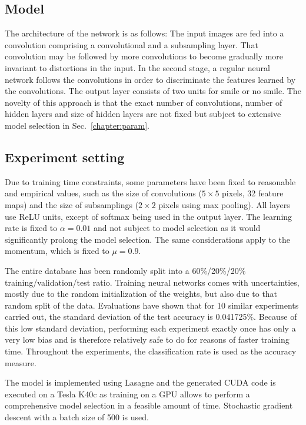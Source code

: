 \documentclass{ws-procs9x6}
\begin{document}
\subsection{Model}
The architecture of the network is as follows:
The input images are fed into a convolution comprising a convolutional and a subsampling layer. That convolution may be followed by more convolutions to become gradually more invariant to distortions in the input. In the second stage, a regular neural network follows the convolutions in order to discriminate the features learned by the convolutions. The output layer consists of two units for smile or no smile.
The novelty of this approach is that the exact number of convolutions, number of hidden layers and size of hidden layers are not fixed but subject to extensive model selection in Sec.~\ref{chapter:param}.

\subsection{Experiment setting}
\label{chapter:setting}
Due to training time constraints, some parameters have been fixed to reasonable and empirical values, such as the size of convolutions ($5\times 5$ pixels, 32 feature maps) and the size of subsamplings ($2\times 2$ pixels using max pooling). All layers use ReLU units, except of softmax being used in the output layer. The learning rate is fixed to $\alpha = 0.01$ and not subject to model selection as it would significantly prolong the model selection. The same considerations apply to the momentum, which is fixed to $\mu = 0.9$.

The entire database has been randomly split into a 60\%/20\%/20\% training/validation/test ratio. Training neural networks comes with uncertainties, mostly due to the random initialization of the weights, but also due to that random split of the data. Evaluations have shown that for 10 similar experiments carried out, the standard deviation of the test accuracy is 0.041725\%. Because of this low standard deviation, performing each experiment exactly once has only a very low bias and is therefore relatively safe to do for reasons of faster training time.
Throughout the experiments, the classification rate is used as the accuracy measure. 

The model is implemented using Lasagne \cite{lasagne} and the generated CUDA code is executed on a Tesla K40c \cite{tesla} as training on a GPU allows to perform a comprehensive model selection in a feasible amount of time. Stochastic gradient descent with a batch size of 500 is used.
\end{document}
